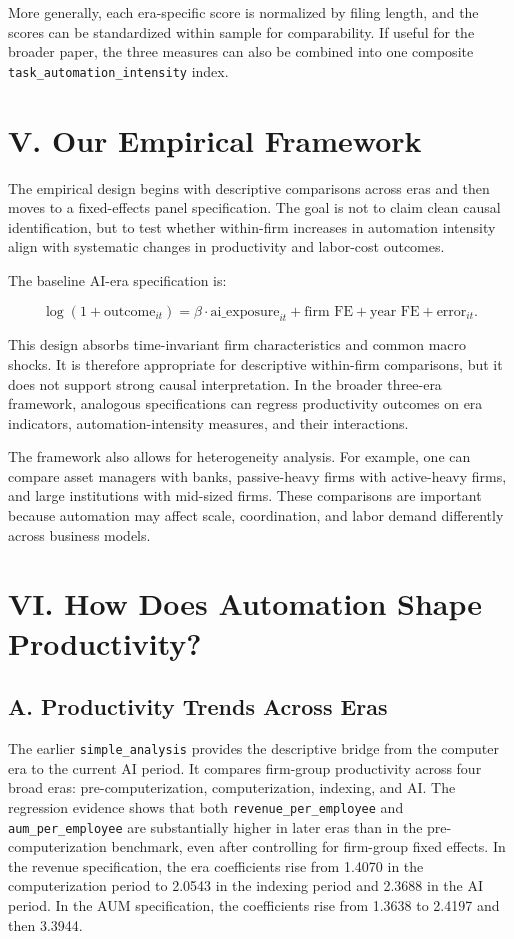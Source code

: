 \documentclass[11pt]{article}
\begin{document}
More generally, each era-specific score is normalized by filing length, and the scores can be standardized within sample for comparability. If useful for the broader paper, the three measures can also be combined into one composite \texttt{task\_automation\_intensity} index.

\section{V. Our Empirical Framework}
The empirical design begins with descriptive comparisons across eras and then moves to a fixed-effects panel specification. The goal is not to claim clean causal identification, but to test whether within-firm increases in automation intensity align with systematic changes in productivity and labor-cost outcomes.

The baseline AI-era specification is:

\begin{equation}
\log(1 + \text{outcome}_{it}) = \beta \cdot \text{ai\_exposure}_{it} + \text{firm FE} + \text{year FE} + \text{error}_{it}.
\end{equation}

This design absorbs time-invariant firm characteristics and common macro shocks. It is therefore appropriate for descriptive within-firm comparisons, but it does not support strong causal interpretation. In the broader three-era framework, analogous specifications can regress productivity outcomes on era indicators, automation-intensity measures, and their interactions.

The framework also allows for heterogeneity analysis. For example, one can compare asset managers with banks, passive-heavy firms with active-heavy firms, and large institutions with mid-sized firms. These comparisons are important because automation may affect scale, coordination, and labor demand differently across business models.

\section{VI. How Does Automation Shape Productivity?}
\subsection{A. Productivity Trends Across Eras}
The earlier \texttt{simple\_analysis} provides the descriptive bridge from the computer era to the current AI period. It compares firm-group productivity across four broad eras: pre-computerization, computerization, indexing, and AI. The regression evidence shows that both \texttt{revenue\_per\_employee} and \texttt{aum\_per\_employee} are substantially higher in later eras than in the pre-computerization benchmark, even after controlling for firm-group fixed effects. In the revenue specification, the era coefficients rise from 1.4070 in the computerization period to 2.0543 in the indexing period and 2.3688 in the AI period. In the AUM specification, the coefficients rise from 1.3638 to 2.4197 and then 3.3944.
\end{document}
